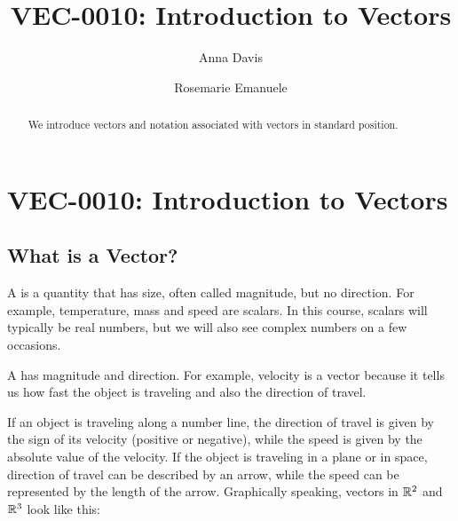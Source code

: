 \documentclass{ximera}
\author{Anna Davis \and Rosemarie Emanuele} \title{VEC-0010: Introduction to Vectors} \license{CC-BY 4.0}
\begin{document}
\begin{abstract}
 We introduce vectors and notation associated with vectors in standard position.
\end{abstract}
\maketitle


\section*{VEC-0010: Introduction to Vectors}

\subsection*{What is a Vector?}

A  is a quantity that has size, often called  magnitude, but no direction.  For example, temperature, mass and speed are scalars.  In this course, scalars will typically be real numbers, but we will also see complex numbers on a few occasions.  

A  has magnitude and direction.  For example, velocity is a vector because it tells us how fast the object is traveling and also the direction of travel.  

If an object is traveling along a number line, the direction of travel is given by the sign of its velocity (positive or negative), while the speed is given by the absolute value of the velocity.  If the object is traveling in a plane or in space, direction of travel can be described by an arrow, while the speed can be represented by the length of the arrow.  Graphically speaking, vectors in $\mathbb{R}^2$ and $\mathbb{R}^3$ look like this: 

\begin{center}
\end{center}
\end{document}
